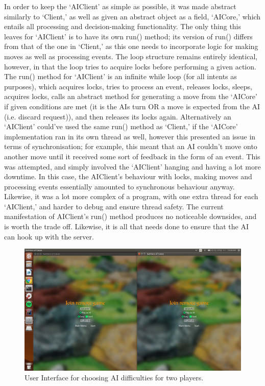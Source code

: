 \documentclass[a4paper,doc,draftfirst]{apa6}
\begin{document}
In order to keep the ‘AIClient’ as simple as possible, it was made abstract similarly to ‘Client,’ as well as given an abstract object as a field, ‘AICore,’ which entails all processing and decision-making functionality. The only thing this leaves for ‘AIClient’ is to have its own run() method; its version of run() differs from that of the one in ‘Client,’ as this one needs to incorporate logic for making moves as well as processing events. The loop structure remains entirely identical, however, in that the loop tries to acquire locks before performing a given action. The run() method for ‘AIClient’ is an infinite while loop (for all intents as purposes), which acquires locks, tries to process an event, releases locks, sleeps, acquires locks, calls an abstract method for generating a move from the ‘AICore’ if given conditions are met (it is the AIs turn OR a move is expected from the AI (i.e. discard request)), and then releases its locks again. Alternatively an ‘AIClient’ could’ve used the same run() method as ‘Client,’ if the ‘AICore’ implementation ran in its own thread as well, however this presented an issue in terms of synchronisation; for example, this meant that an AI couldn’t move onto another move until it received some sort of feedback in the form of an event. This was attempted, and simply involved the ‘AIClient’ hanging and having a lot more downtime. In this case, the AIClient’s behaviour with locks, making moves and processing events essentially amounted to synchronous behaviour anyway. Likewise, it was a lot more complex of a program, with one extra thread for each ‘AIClient,’ and harder to debug and ensure thread safety. The current manifestation of AIClient’s run() method produces no noticeable downsides, and is worth the trade off. Likewise, it is all that needs done to ensure that the AI can hook up with the server.

\begin{figure}[hbtp]
      \includegraphics[width=\textwidth]{aiSetUp}
      \caption{User Interface for choosing AI difficulties for two players.}
\end{figure}
\end{document}
